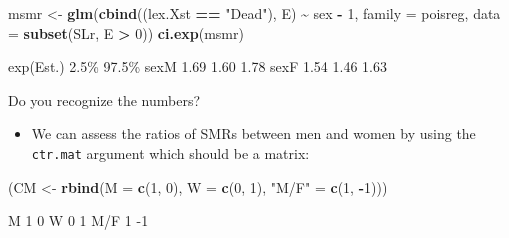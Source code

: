 \documentclass[
]{book}
\newenvironment{Shaded}{\begin{snugshade}}{\end{snugshade}}
\newcommand{\AttributeTok}[1]{\textcolor[rgb]{0.13,0.29,0.53}{#1}}
\newcommand{\DecValTok}[1]{\textcolor[rgb]{0.00,0.00,0.81}{#1}}
\newcommand{\FunctionTok}[1]{\textcolor[rgb]{0.13,0.29,0.53}{\textbf{#1}}}
\newcommand{\NormalTok}[1]{#1}
\newcommand{\OtherTok}[1]{\textcolor[rgb]{0.56,0.35,0.01}{#1}}
\newcommand{\SpecialCharTok}[1]{\textcolor[rgb]{0.81,0.36,0.00}{\textbf{#1}}}
\newcommand{\StringTok}[1]{\textcolor[rgb]{0.31,0.60,0.02}{#1}}
\providecommand{\tightlist}{%
  \setlength{\itemsep}{0pt}\setlength{\parskip}{0pt}}
\begin{document}
\begin{enumerate}
\begin{Shaded}
\begin{Highlighting}[]
\NormalTok{msmr }\OtherTok{\textless{}{-}} \FunctionTok{glm}\NormalTok{(}\FunctionTok{cbind}\NormalTok{((lex.Xst }\SpecialCharTok{==} \StringTok{"Dead"}\NormalTok{), E) }\SpecialCharTok{\textasciitilde{}}\NormalTok{ sex }\SpecialCharTok{{-}} \DecValTok{1}\NormalTok{,}
            \AttributeTok{family =}\NormalTok{ poisreg,}
              \AttributeTok{data =} \FunctionTok{subset}\NormalTok{(SLr, E }\SpecialCharTok{\textgreater{}} \DecValTok{0}\NormalTok{))}
\FunctionTok{ci.exp}\NormalTok{(msmr)}
\end{Highlighting}
\end{Shaded}

\begin{Shaded}
\begin{Highlighting}[]
\NormalTok{     exp(Est.) 2.5\% 97.5\%}
\NormalTok{sexM      1.69 1.60  1.78}
\NormalTok{sexF      1.54 1.46  1.63}
\end{Highlighting}
\end{Shaded}

  Do you recognize the numbers?

  \begin{itemize}
  \tightlist
  \item
    We can assess the ratios of SMRs between men and women by using the
    \texttt{ctr.mat} argument which should be a matrix:
  \end{itemize}

\begin{Shaded}
\begin{Highlighting}[]
\NormalTok{(CM }\OtherTok{\textless{}{-}} \FunctionTok{rbind}\NormalTok{(}\AttributeTok{M =} \FunctionTok{c}\NormalTok{(}\DecValTok{1}\NormalTok{, }\DecValTok{0}\NormalTok{),}
             \AttributeTok{W =} \FunctionTok{c}\NormalTok{(}\DecValTok{0}\NormalTok{, }\DecValTok{1}\NormalTok{),}
         \StringTok{"M/F"} \OtherTok{=} \FunctionTok{c}\NormalTok{(}\DecValTok{1}\NormalTok{, }\SpecialCharTok{{-}}\DecValTok{1}\NormalTok{)))}
\end{Highlighting}
\end{Shaded}

\begin{Shaded}
\begin{Highlighting}[]
\NormalTok{    [,1] [,2]}
\NormalTok{M      1    0}
\NormalTok{W      0    1}
\NormalTok{M/F    1   {-}1}
\end{Highlighting}
\end{Shaded}


\end{enumerate}
\end{document}
